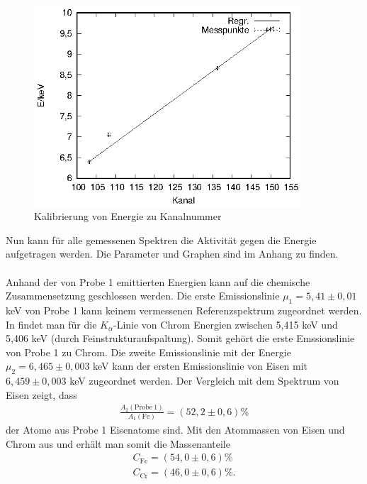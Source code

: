 \begin{figure}
  \centering
  \includegraphics[width=10cm]{data/Massenanteil/kalibrierung.eps}
  \caption{Kalibrierung von Energie zu Kanalnummer}
  \label{fig:kalibrierung}
\end{figure}

Nun kann für alle gemessenen Spektren die Aktivität gegen die Energie aufgetragen werden. Die Parameter und Graphen sind im Anhang zu finden. \\ \\
Anhand der von Probe 1 emittierten Energien kann auf die chemische Zusammensetzung geschlossen werden. Die erste Emissionslinie $\mu_1=5,41 \pm 0,01$ keV von Probe 1 kann keinem vermessenen Referenzspektrum zugeordnet werden. In \cite{booklet} findet man für die $K_\alpha$-Linie von Chrom Energien zwischen 5,415 keV und 5,406 keV (durch Feinstrukturaufspaltung). Somit gehört die erste Emssionslinie von Probe 1 zu Chrom. Die zweite Emissionslinie mit der Energie $\mu_2=6,465 \pm 0,003$ keV kann der ersten Emissionslinie von Eisen mit $6,459 \pm 0,003$ keV zugeordnet werden. Der Vergleich mit dem Spektrum von Eisen zeigt, dass 
\begin{align*}
  \frac{A_2(\mathrm{Probe \ 1})}{A_1(\mathrm{Fe})}=(52,2 \pm 0,6) \%
\end{align*}
der Atome aus Probe 1 Eisenatome sind. Mit den Atommassen von Eisen und Chrom aus \cite{fe} und \cite{cr} erhält man somit die Massenanteile
\begin{align*}
  C_\mathrm{Fe}=(54,0 \pm 0,6) \% \\
  C_\mathrm{Cr}=(46,0 \pm 0,6) \%.
\end{align*}

